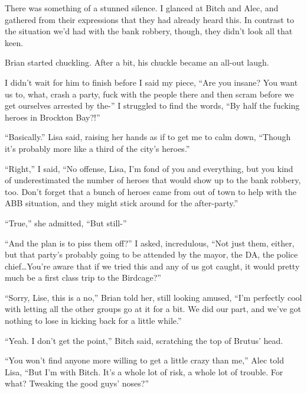There was something of a stunned silence.  I glanced at Bitch and Alec, and gathered from their expressions that they had already heard this.  In contrast to the situation we'd had with the bank robbery, though, they didn't look all that keen.



Brian started chuckling.  After a bit, his chuckle became an all-out laugh.



I didn't wait for him to finish before I said my piece, ``Are you insane?  You want us to, what, crash a party, fuck with the people there and then scram before we get ourselves arrested by the-'' I struggled to find the words, ``By half the fucking heroes in Brockton Bay?!''



``Basically.''  Lisa said, raising her hands as if to get me to calm down, ``Though it's probably more like a third of the city's heroes.''



``Right,'' I said, ``No offense, Lisa, I'm fond of you and everything, but you kind of underestimated the number of heroes that would show up to the bank robbery, too.  Don't forget that a bunch of heroes came from out of town to help with the ABB situation, and they might stick around for the after-party.''



``True,'' she admitted, ``But still-''



``And the plan is to piss them off?'' I asked, incredulous, ``Not just them, either, but that party's probably going to be attended by the mayor, the DA, the police chief\ldots You're aware that if we tried this and any of us got caught, it would pretty much be a first class trip to the Birdcage?''



``Sorry, Lise, this is a no,'' Brian told her, still looking amused, ``I'm perfectly cool with letting all the other groups go at it for a bit.  We did our part, and we've got nothing to lose in kicking back for a little while.''



``Yeah.  I don't get the point,'' Bitch said, scratching the top of Brutus' head.



``You won't find anyone more willing to get a little crazy than me,'' Alec told Lisa, ``But I'm with Bitch.  It's a whole lot of risk, a whole lot of trouble.  For what?  Tweaking the good guys' noses?''



